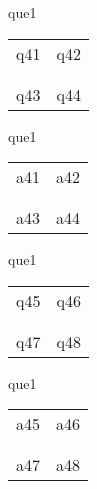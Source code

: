 \documentclass[13.5pt, varwidth=true]{beamer}
\begin{document}
\begin{frame}[shrink=19,fragile]
	\begin{beamercolorbox}[rounded=true, left, shadow=true,wd=14.8cm]{que1}
		\begin{tabular}{p{7cm} | p{7cm}}
			\parbox{7cm}{q41 } & \parbox{7cm}{q42 } \\\\ 
			\hline
			\\ \parbox{7cm}{q43 } & \parbox{7cm}{q44 } \\
		\end{tabular}
	\end{beamercolorbox}
\end{frame}
\begin{frame}[shrink=19,fragile]
	\begin{beamercolorbox}[rounded=true, left, shadow=true,wd=14.8cm]{que1}
		\begin{tabular}{p{7cm} | p{7cm}}
			\textcolor{ared}{a41 }  & \textcolor{ared}{a42 } \\\\ 
			\hline
			\\ \textcolor{ared}{a43 }  & \textcolor{ared}{a44 } \\
		\end{tabular}
	\end{beamercolorbox}
\end{frame}

\begin{frame}[shrink=19,fragile]
	\begin{beamercolorbox}[rounded=true, left, shadow=true,wd=14.8cm]{que1}
		\begin{tabular}{p{7cm} | p{7cm}}
			\parbox{7cm}{q45 } & \parbox{7cm}{q46 } \\\\ 
			\hline
			\\ \parbox{7cm}{q47 } & \parbox{7cm}{q48 } \\
		\end{tabular}
	\end{beamercolorbox}
\end{frame}
\begin{frame}[shrink=19,fragile]
	\begin{beamercolorbox}[rounded=true, left, shadow=true,wd=14.8cm]{que1}
		\begin{tabular}{p{7cm} | p{7cm}}
			\textcolor{ared}{a45 }  & \textcolor{ared}{a46 } \\\\ 
			\hline
			\\ \textcolor{ared}{a47 }  & \textcolor{ared}{a48 } \\
		\end{tabular}
	\end{beamercolorbox}
\end{frame}
\end{document}
